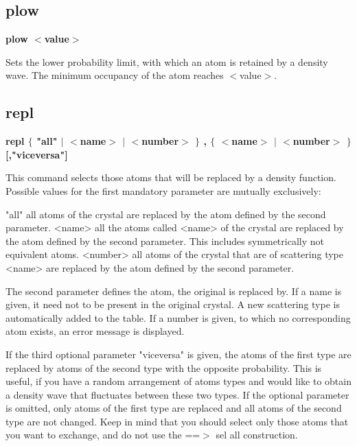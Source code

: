 \subsection*{plow}
{\bf plow $ <$value$> $ \par }
\par
\vspace{3pt}
Sets the lower probability limit, with which an atom is retained by a 
density wave. The minimum occupancy of the atom reaches $ <$value$> $. 
\subsection*{repl}
{\bf repl $ \{$ "all" $| $ $ <$name$> $ $| $ $ <$number$> $ $\} $ , $ \{$ $ <$name$> $ $| $ $ <$number$> $ $\} $ [,"viceversa"] \par }
\par
\vspace{3pt}
This command selects those atoms that will be replaced by a density 
function. Possible values for the first mandatory parameter are mutually 
exclusively: 
\par
\begin{MacVerbatim}
"all"     all atoms of the crystal are replaced by the atom defined
          by the second parameter.
<name>    all the atoms called <name> of the crystal are replaced by
          the atom defined by the second parameter. This includes
          symmetrically not equivalent atoms.
<number>  all atoms of the crystal that are of scattering type <name>
          are replaced by the atom defined by the second parameter.
\end{MacVerbatim}
The second parameter defines the atom, the original is replaced by. 
If a name is given, it need not to be present in the original crystal. 
A new scattering type is automatically added to the table. If a number 
is given, to which no corresponding atom exists, an error message is 
displayed. 
\par
If the third optional parameter "viceversa" is given, the atoms 
of the first type are replaced by atoms of the second type with the 
opposite probability. 
This is useful, if you have a random arrangement of atoms types 
and would like to obtain a density wave that 
fluctuates between these two types. If the optional parameter is 
omitted, only atoms of the first type are replaced and all 
atoms of the second type are not changed. 
Keep in mind that you should select only those atoms that you 
want to exchange, and do not use the ==$> $ sel all construction. 
\par

